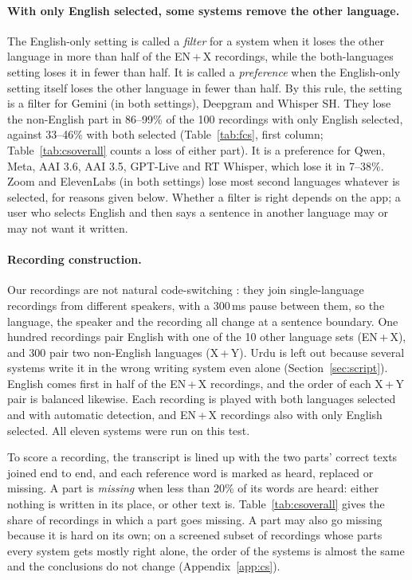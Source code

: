 \documentclass[11pt]{article}
\begin{document}
\paragraph{With only English selected, some systems remove the other language.} The English-only setting is called a \emph{filter} for a system when it loses the other language in more than half of the EN\,+\,X recordings, while the both-languages setting loses it in fewer than half. It is called a \emph{preference} when the English-only setting itself loses the other language in fewer than half. By this rule, the setting is a filter for Gemini (in both settings), Deepgram and Whisper SH. They lose the non-English part in 86--99\% of the 100 recordings with only English selected, against 33--46\% with both selected (Table~\ref{tab:fcs}, first column; Table~\ref{tab:csoverall} counts a loss of either part). It is a preference for Qwen, Meta, AAI 3.6, AAI 3.5, GPT-Live and RT Whisper, which lose it in 7--38\%. Zoom and ElevenLabs (in both settings) lose most second languages whatever is selected, for reasons given below. Whether a filter is right depends on the app; a user who selects English and then says a sentence in another language may or may not want it written.

\paragraph{Recording construction.} Our recordings are not natural code-switching \citep{poplack1980sometimes,winata2023decades}: they join single-language recordings from different speakers, with a 300\,ms pause between them, so the language, the speaker and the recording all change at a sentence boundary. One hundred recordings pair English with one of the 10 other language sets (EN\,+\,X), and 300 pair two non-English languages (X\,+\,Y). Urdu is left out because several systems write it in the wrong writing system even alone (Section~\ref{sec:script}). English comes first in half of the EN\,+\,X recordings, and the order of each X\,+\,Y pair is balanced likewise. Each recording is played with both languages selected and with automatic detection, and EN\,+\,X recordings also with only English selected. All eleven systems were run on this test.

To score a recording, the transcript is lined up with the two parts' correct texts joined end to end, and each reference word is marked as heard, replaced or missing. A part is \emph{missing} when less than 20\% of its words are heard: either nothing is written in its place, or other text is. Table~\ref{tab:csoverall} gives the share of recordings in which a part goes missing. A part may also go missing because it is hard on its own; on a screened subset of recordings whose parts every system gets mostly right alone, the order of the systems is almost the same and the conclusions do not change (Appendix~\ref{app:cs}).
\end{document}
